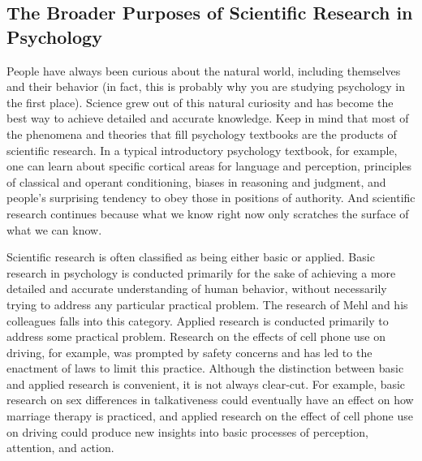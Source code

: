 \subsection{The Broader Purposes of Scientific Research in Psychology}
People have always been curious about the natural world, including themselves and their behavior (in fact, this is probably why you are studying psychology in the first place). Science grew out of this natural curiosity and has become the best way to achieve detailed and accurate knowledge. Keep in mind that most of the phenomena and theories that fill psychology textbooks are the products of scientific research. In a typical introductory psychology textbook, for example, one can learn about specific cortical areas for language and perception, principles of classical and operant conditioning, biases in reasoning and judgment, and people's surprising tendency to obey those in positions of authority. And scientific research continues because what we know right now only scratches the surface of what we can know.

Scientific research is often classified as being either basic or applied. Basic research in psychology is conducted primarily for the sake of achieving a more detailed and accurate understanding of human behavior, without necessarily trying to address any particular practical problem. The research of Mehl and his colleagues falls into this category. Applied research is conducted primarily to address some practical problem. Research on the effects of cell phone use on driving, for example, was prompted by safety concerns and has led to the enactment of laws to limit this practice. Although the distinction between basic and applied research is convenient, it is not always clear-cut. For example, basic research on sex differences in talkativeness could eventually have an effect on how marriage therapy is practiced, and applied research on the effect of cell phone use on driving could produce new insights into basic processes of perception, attention, and action.

